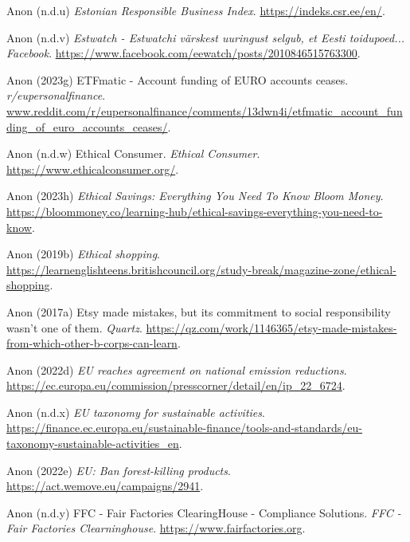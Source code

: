 \documentclass[
  letterpaper,
  DIV=11,
  numbers=noendperiod]{scrartcl}
\newlength{\cslhangindent}
\newenvironment{CSLReferences}[2] %
 {\begin{list}{}{%
  \setlength{\itemindent}{0pt}
  \setlength{\leftmargin}{0pt}
  \setlength{\parsep}{0pt}
  \ifodd #1
   \setlength{\leftmargin}{\cslhangindent}
   \setlength{\itemindent}{-1\cslhangindent}
  \fi
  \setlength{\itemsep}{#2\baselineskip}}}
 {\end{list}}
\begin{document}
\begin{CSLReferences}{0}{1}
Anon (n.d.u) \emph{Estonian {Responsible Business Index}}.
\url{https://indeks.csr.ee/en/}.

Anon (n.d.v) \emph{Estwatch - {Estwatchi} v{ä}rskest uuringust selgub,
et {Eesti} toidupoed... {\textbar} {Facebook}}.
\url{https://www.facebook.com/eewatch/posts/2010846515763300}.

Anon (2023g) {ETFmatic} - {Account} funding of {EURO} accounts ceases.
\emph{r/eupersonalfinance}.
\href{https://www.reddit.com/r/eupersonalfinance/comments/13dwn4i/etfmatic_account_funding_of_euro_accounts_ceases/}{www.reddit.com/r/eupersonalfinance/comments/13dwn4i/etfmatic\_account\_funding\_of\_euro\_accounts\_ceases/}.

Anon (n.d.w) Ethical {Consumer}. \emph{Ethical Consumer}.
\url{https://www.ethicalconsumer.org/}.

Anon (2023h) \emph{Ethical {Savings}: {Everything You Need To Know}
{\textbar} {Bloom Money}}.
\url{https://bloommoney.co/learning-hub/ethical-savings-everything-you-need-to-know}.

Anon (2019b) \emph{Ethical shopping}.
\url{https://learnenglishteens.britishcouncil.org/study-break/magazine-zone/ethical-shopping}.

Anon (2017a) Etsy made mistakes, but its commitment to social
responsibility wasn't one of them. \emph{Quartz}.
\url{https://qz.com/work/1146365/etsy-made-mistakes-from-which-other-b-corps-can-learn}.

Anon (2022d) \emph{{EU} reaches agreement on national emission
reductions}.
\url{https://ec.europa.eu/commission/presscorner/detail/en/ip_22_6724}.

Anon (n.d.x) \emph{{EU} taxonomy for sustainable activities}.
\url{https://finance.ec.europa.eu/sustainable-finance/tools-and-standards/eu-taxonomy-sustainable-activities_en}.

Anon (2022e) \emph{{EU}: {Ban} forest-killing products}.
\url{https://act.wemove.eu/campaigns/2941}.

Anon (n.d.y) {FFC} - {Fair Factories ClearingHouse} - {Compliance
Solutions}. \emph{FFC - Fair Factories Clearninghouse}.
\url{https://www.fairfactories.org}.


\end{CSLReferences}
\end{document}
